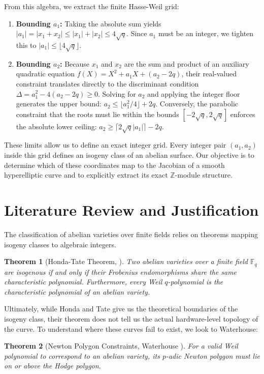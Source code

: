 \documentclass[letterpaper, 11pt]{article}
\newtheorem{theorem}{Theorem}[section]
\begin{document}
From this algebra, we extract the finite Hasse-Weil grid:
\begin{enumerate}
    \item \textbf{Bounding $a_1$:} Taking the absolute sum yields $|a_1| = |x_1 + x_2| \le |x_1| + |x_2| \le 4\sqrt{q}$. Since $a_1$ must be an integer, we tighten this to $|a_1| \le \lfloor 4\sqrt{q} \rfloor$.
    \item \textbf{Bounding $a_2$:} Because $x_1$ and $x_2$ are the sum and product of an auxiliary quadratic equation $f(X) = X^2 + a_1 X + (a_2 - 2q)$, their real-valued constraint translates directly to the discriminant condition $\Delta = a_1^2 - 4(a_2 - 2q) \ge 0$. Solving for $a_2$ and applying the integer floor generates the upper bound: $a_2 \le \lfloor a_1^2/4 \rfloor + 2q$. Conversely, the parabolic constraint that the roots must lie within the bounds $[-2\sqrt{q}, 2\sqrt{q}]$ enforces the absolute lower ceiling: $a_2 \ge \lceil 2\sqrt{q}|a_1| \rceil - 2q$.
\end{enumerate}

These limits allow us to define an exact integer grid. Every integer pair $(a_1, a_2)$ inside this grid defines an isogeny class of an abelian surface. Our objective is to determine which of these coordinates map to the Jacobian of a smooth hyperelliptic curve and to explicitly extract its exact $\mathbb{Z}$-module structure.

\section{Literature Review and Justification}
The classification of abelian varieties over finite fields relies on theorems mapping isogeny classes to algebraic integers. 

\begin{theorem}[Honda-Tate Theorem, \cite{Honda1968, Tate1966}]
Two abelian varieties over a finite field $\mathbb{F}_q$ are isogenous if and only if their Frobenius endomorphisms share the same characteristic polynomial. Furthermore, every Weil $q$-polynomial is the characteristic polynomial of an abelian variety.
\end{theorem}

Ultimately, while Honda and Tate give us the theoretical boundaries of the isogeny class, their theorem does not tell us the actual hardware-level topology of the curve. To understand where these curves fail to exist, we look to Waterhouse:

\begin{theorem}[Newton Polygon Constraints, Waterhouse \cite{Waterhouse1969}]
For a valid Weil polynomial to correspond to an abelian variety, its $p$-adic Newton polygon must lie on or above the Hodge polygon.
\end{theorem}
\end{document}
